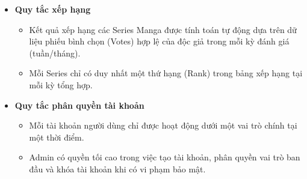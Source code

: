\begin{itemize}
\begin{itemize}
    \end{itemize}
    \item \textbf{Quy tắc xếp hạng}
    \begin{itemize}
        \item Kết quả xếp hạng các Series Manga được tính toán tự động dựa trên dữ liệu phiếu bình chọn (Votes) hợp lệ của độc giả trong mỗi kỳ đánh giá (tuần/tháng).
        \item Mỗi Series chỉ có duy nhất một thứ hạng (Rank) trong bảng xếp hạng tại mỗi kỳ tổng hợp.
    \end{itemize}
    \item \textbf{Quy tắc phân quyền tài khoản}
    \begin{itemize}
        \item Mỗi tài khoản người dùng chỉ được hoạt động dưới một vai trò chính tại một thời điểm.
        \item Admin có quyền tối cao trong việc tạo tài khoản, phân quyền vai trò ban đầu và khóa tài khoản khi có vi phạm bảo mật.
    \end{itemize}
\end{itemize}
